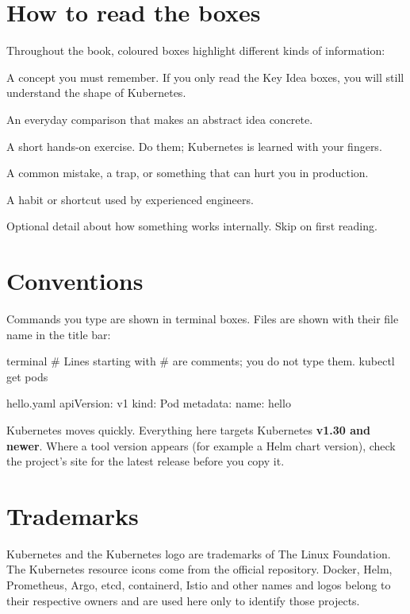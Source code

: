 \section*{How to read the boxes}

Throughout the book, coloured boxes highlight different kinds of information:

\begin{keyidea}
A concept you must remember. If you only read the Key Idea boxes, you will
still understand the shape of Kubernetes.
\end{keyidea}

\begin{analogy}
An everyday comparison that makes an abstract idea concrete.
\end{analogy}

\begin{tryit}
A short hands-on exercise. Do them; Kubernetes is learned with your fingers.
\end{tryit}

\begin{warningbox}
A common mistake, a trap, or something that can hurt you in production.
\end{warningbox}

\begin{protip}
A habit or shortcut used by experienced engineers.
\end{protip}

\begin{deepdive}
Optional detail about how something works internally. Skip on first reading.
\end{deepdive}

\section*{Conventions}

Commands you type are shown in terminal boxes. Files are shown with their file
name in the title bar:

\begin{bashcode}{terminal}
# Lines starting with # are comments; you do not type them.
kubectl get pods
\end{bashcode}

\begin{yamlcode}{hello.yaml}
apiVersion: v1
kind: Pod
metadata:
  name: hello
\end{yamlcode}

Kubernetes moves quickly. Everything here targets Kubernetes \textbf{v1.30 and
newer}. Where a tool version appears (for example a Helm chart version), check
the project's site for the latest release before you copy it.

\section*{Trademarks}

Kubernetes and the Kubernetes logo are trademarks of The Linux Foundation. The
Kubernetes resource icons come from the official 
repository. Docker, Helm, Prometheus, Argo, etcd, containerd, Istio and other
names and logos belong to their respective owners and are used here only to
identify those projects.
